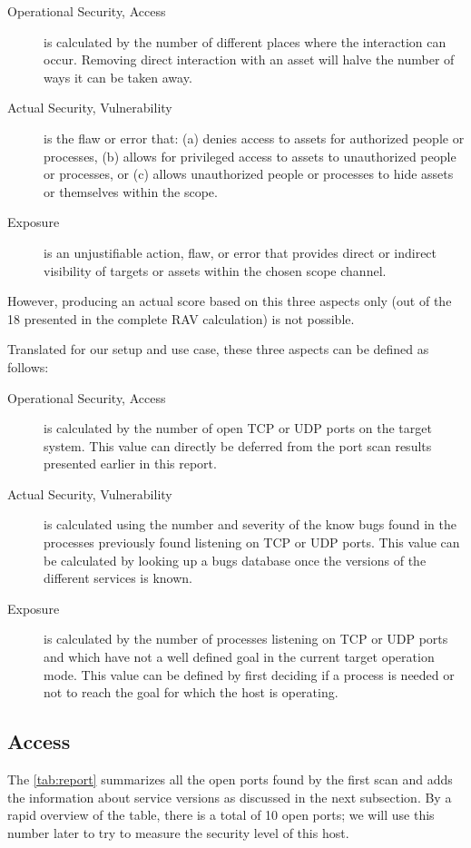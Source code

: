 \documentclass[10pt,a4paper,twoside,onecolumn]{article}
\begin{document}
\begin{description}
	\item[Operational Security, Access] is calculated by the number of different places where the interaction can occur. Removing direct interaction with an asset will halve the number of ways it can be taken away.
	\item[Actual Security, Vulnerability] is the flaw or error that: (a) denies access to assets for authorized people or processes, (b) allows for privileged access to assets to unauthorized people or processes, or (c) allows unauthorized people or processes to hide assets or themselves within the scope.
	\item[Exposure] is an unjustifiable action, flaw, or error that provides direct or indirect visibility of targets or assets within the chosen scope channel.
\end{description}

However, producing an actual score based on this three aspects only (out of the 18 presented in the complete RAV calculation) is not possible.

Translated for our setup and use case, these three aspects can be defined as follows:

\begin{description}
	\item[Operational Security, Access] is calculated by the number of open TCP or UDP ports on the target system. This value can directly be deferred from the port scan results presented earlier in this report.
	\item[Actual Security, Vulnerability] is calculated using the number and severity of the know bugs found in the processes previously found listening on TCP or UDP ports. This value can be calculated by looking up a bugs database once the versions of the different services is known.
	\item[Exposure] is calculated by the number of processes listening on TCP or UDP ports and which have not a well defined goal in the current target operation mode. This value can be defined by first deciding if a process is needed or not to reach the goal for which the host is operating.
\end{description}

\subsection{Access}

The \autoref{tab:report} summarizes all the open ports found by the first scan and adds the information about service versions as discussed in the next subsection. By a rapid overview of the table, there is a total of 10 open ports; we will use this number later to try to measure the security level of this host.
\end{document}
